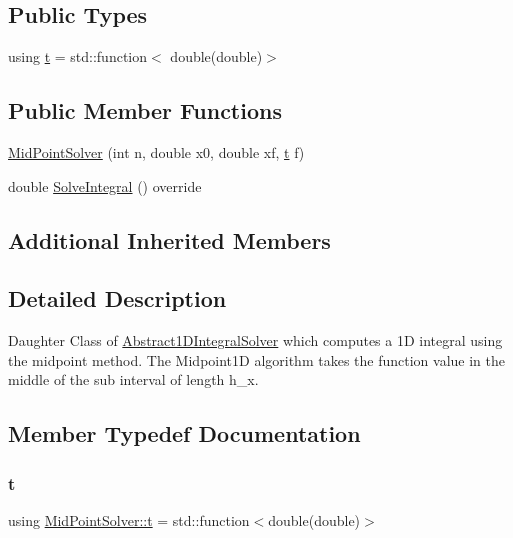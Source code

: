 \subsection*{Public Types}
\begin{DoxyCompactItemize}
\item 
using \hyperlink{class_mid_point_solver_a48db3b6c36d4edf214150e267c3d063c}{t} = std\+::function$<$ double(double)$>$
\end{DoxyCompactItemize}
\subsection*{Public Member Functions}
\begin{DoxyCompactItemize}
\item 
\hyperlink{class_mid_point_solver_afc0c085bfd86c3f17cb6dd0852ab7426}{Mid\+Point\+Solver} (int n, double x0, double xf, \hyperlink{class_abstract1_d_integral_solver_a7d8e60dfe7eb70e5c19dd71ac0b03880}{t} f)
\item 
double \hyperlink{class_mid_point_solver_a3e7224a0fb07b3ef7f5f9e7e577216cf}{Solve\+Integral} () override
\end{DoxyCompactItemize}
\subsection*{Additional Inherited Members}


\subsection{Detailed Description}
Daughter Class of \hyperlink{class_abstract1_d_integral_solver}{Abstract1\+D\+Integral\+Solver} which computes a 1D integral using the midpoint method. The Midpoint1D algorithm takes the function value in the middle of the sub interval of length h\+\_\+x. 

\subsection{Member Typedef Documentation}
\mbox{\label{class_mid_point_solver_a48db3b6c36d4edf214150e267c3d063c}} 
\subsubsection{\texorpdfstring{t}{t}}
{\footnotesize\ttfamily using \hyperlink{class_mid_point_solver_a48db3b6c36d4edf214150e267c3d063c}{Mid\+Point\+Solver\+::t} =  std\+::function$<$double(double)$>$}

